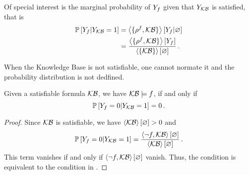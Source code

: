 % 
Of special interest is the marginal probability of $Y_{f}$ given that $Y_{\mathcal{KB}}$ is satisfied, that is
\begin{align*}
	\mathbb{P}\left[Y_{f}|Y_{\mathcal{KB}}=1\right] 
	& = \left\langle \{\rho^{f} ,\mathcal{KB}\}\right\rangle \left[ Y_{f} | \varnothing \right]\\
	& = \frac{\left\langle \{\rho^{f},\mathcal{KB}\}\right\rangle \left[ Y_{f} \right]}{\left\langle \{\mathcal{KB}\}\right\rangle \left[ \varnothing \right]} \, . 
\end{align*}


\begin{remark}
	When the Knowledge Base is not satisfiable, one cannot normate it and the probability distribution is not dedfined.
\end{remark}




% 
\begin{theorem}\label{the:probEntailment}
	Given a satisfiable formula $\mathcal{KB}$, we have $\mathcal{KB}\models f$, if and only if 
		\[ \mathbb{P}\left[Y_{f}=0|Y_{\mathcal{KB}}=1\right] = 0 \, .  \]
\end{theorem}
\begin{proof}
	Since $\mathcal{KB}$ is satisfiable, we have $\left\langle \mathcal{KB}\right\rangle \left[ \varnothing \right]>0$ and
		\[ \mathbb{P}\left[Y_{f}=0|Y_{\mathcal{KB}}=1\right] = \frac{\left\langle \lnot f, \mathcal{KB}\right\rangle \left[ \varnothing \right]}{\left\langle \mathcal{KB}\right\rangle \left[ \varnothing \right]} \, .  \]
	This term vanishes if and only if $\left\langle \lnot f, \mathcal{KB}\right\rangle \left[ \varnothing \right]$ vanish.
	Thus, the condition is equivalent to the condition in .
\end{proof}


